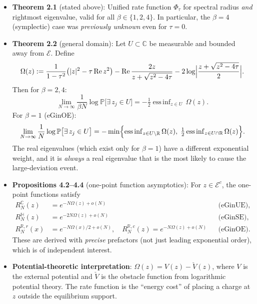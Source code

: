 \documentclass[11pt,a4paper]{article}
\theoremstyle{definition}
\theoremstyle{remark}
\begin{document}
\begin{itemize}
\item \textbf{Theorem 2.1} (stated above): Unified rate function $\Phi_\tau$ for spectral radius \emph{and} rightmost eigenvalue, valid for all $\beta\in\{1,2,4\}$.  In particular, the $\beta=4$ (symplectic) case was \emph{previously unknown} even for $\tau=0$.

\item \textbf{Theorem 2.2} (general domain): Let $U\subset\mathbb{C}$ be measurable and bounded away from $\mathcal{E}$.  Define
\[
\Omega(z):=\frac{1}{1-\tau^2}\bigl(|z|^2-\tau\operatorname{Re} z^2\bigr)
-\operatorname{Re}\frac{2z}{z+\sqrt{z^2-4\tau}}
-2\log\Bigl|\frac{z+\sqrt{z^2-4\tau}}{2}\Bigr|.
\]
Then for $\beta=2,4$:
\[
\lim_{N\to\infty}\frac{1}{\beta N}\log\mathbb{P}\bigl[\exists\, z_j\in U\bigr]=-\tfrac{1}{2}\operatorname{ess\,inf}_{z\in U}\,\Omega(z).
\]
For $\beta=1$ (eGinOE):
\[
\lim_{N\to\infty}\frac{1}{N}\log\mathbb{P}\bigl[\exists\, z_j\in U\bigr]
=-\min\Bigl\{\operatorname{ess\,inf}_{z\in U\setminus\mathbb{R}}\Omega(z),\;\tfrac{1}{2}\operatorname{ess\,inf}_{z\in U\cap\mathbb{R}}\Omega(z)\Bigr\}.
\]
The real eigenvalues (which exist only for $\beta=1$) have a different exponential weight, and it is \emph{always} a real eigenvalue that is the most likely to cause the large-deviation event.

\item \textbf{Propositions 4.2--4.4} (one-point function asymptotics): For $z\in\mathcal{E}^c$, the one-point functions satisfy
\begin{align*}
R_N^{\mathbb{C}}(z)&= e^{-N\Omega(z)+o(N)} &&\text{(eGinUE)},\\
R_N^{\mathbb{H}}(z)&= e^{-2N\Omega(z)+o(N)} &&\text{(eGinSE)},\\
R_N^{\mathbb{R},r}(x)&= e^{-N\Omega(x)/2+o(N)},\quad
R_N^{\mathbb{R},c}(z)= e^{-N\Omega(z)+o(N)} &&\text{(eGinOE)}.
\end{align*}
These are derived with \emph{precise} prefactors (not just leading exponential order), which is of independent interest.

\item \textbf{Potential-theoretic interpretation}: $\Omega(z)=V(z)-\check{V}(z)$, where $V$ is the external potential and $\check{V}$ is the obstacle function from logarithmic potential theory.  The rate function is the ``energy cost'' of placing a charge at $z$ outside the equilibrium support.
\end{itemize}

\end{document}
